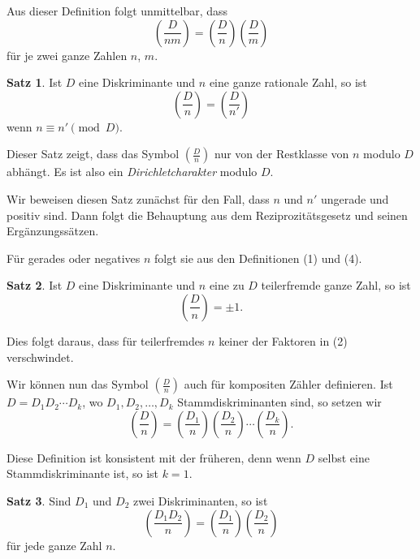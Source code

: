 \documentclass[12pt,a4paper]{article}
\theoremstyle{definition}
\newtheorem*{satz}{Satz}
\begin{document}
Aus dieser Definition folgt unmittelbar, dass
\begin{equation}\tag{5}
\left(\frac{D}{nm}\right) = \left(\frac{D}{n}\right) \left(\frac{D}{m}\right)
\end{equation}
f\"ur je zwei ganze Zahlen $n$, $m$.

\begin{satz}
Ist $D$ eine Diskriminante und $n$ eine ganze rationale Zahl,
so ist
\begin{equation}\tag{6}
\left(\frac{D}{n}\right) = \left(\frac{D}{n'}\right)
\end{equation}
wenn $n \equiv n' \pmod{D}$.
\end{satz}

Dieser Satz zeigt, dass das Symbol $\left(\frac{D}{n}\right)$ nur von der
Restklasse von $n$ modulo $D$ abh\"angt. Es ist also ein
\textit{Dirichletcharakter} modulo $D$.

Wir beweisen diesen Satz zun\"achst f\"ur den Fall, dass $n$ und
$n'$ ungerade und positiv sind. Dann folgt die Behauptung
aus dem Reziprozit\"atsgesetz und seinen Erg\"anzungss\"atzen.

F\"ur gerades oder negatives $n$ folgt sie aus den
Definitionen (1) und (4).

\begin{satz}
Ist $D$ eine Diskriminante und $n$ eine zu $D$ teilerfremde
ganze Zahl, so ist
\begin{equation}\tag{7}
\left(\frac{D}{n}\right) = \pm 1.
\end{equation}
\end{satz}

Dies folgt daraus, dass f\"ur teilerfremdes $n$ keiner der
Faktoren in (2) verschwindet.

Wir k\"onnen nun das Symbol $\left(\frac{D}{n}\right)$ auch f\"ur
kompositen Z\"ahler definieren. Ist $D = D_1 D_2 \cdots D_k$,
wo $D_1, D_2, \ldots, D_k$ Stammdiskriminanten sind, so setzen wir
\begin{equation}\tag{8}
\left(\frac{D}{n}\right) = \left(\frac{D_1}{n}\right) \left(\frac{D_2}{n}\right) \cdots \left(\frac{D_k}{n}\right).
\end{equation}

Diese Definition ist konsistent mit der fr\"uheren, denn wenn
$D$ selbst eine Stammdiskriminante ist, so ist $k = 1$.

\begin{satz}
Sind $D_1$ und $D_2$ zwei Diskriminanten, so ist
\begin{equation}\tag{9}
\left(\frac{D_1 D_2}{n}\right) = \left(\frac{D_1}{n}\right) \left(\frac{D_2}{n}\right)
\end{equation}
f\"ur jede ganze Zahl $n$.
\end{satz}
\end{document}

